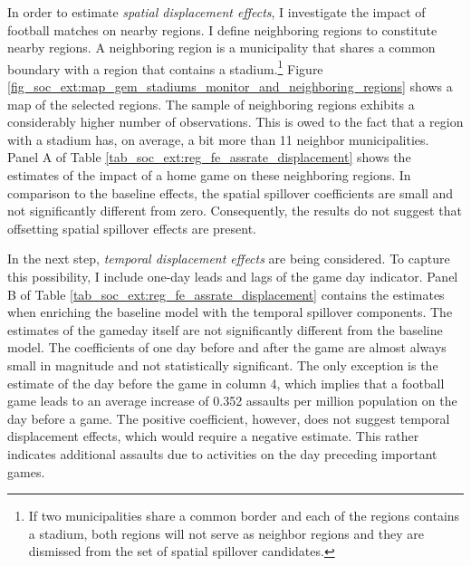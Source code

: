 In order to estimate \textit{spatial displacement effects}, I investigate the impact of football matches on nearby regions. I define neighboring regions to constitute nearby regions. A neighboring region is a municipality that shares a common boundary with a region that contains a stadium.\footnote{If two municipalities share a common border and each of the regions contains a stadium, both regions will not serve as neighbor regions and they are dismissed from the set of spatial spillover candidates.} Figure \ref{fig_soc_ext:map_gem_stadiums_monitor_and_neighboring_regions} shows a map of the selected regions. The sample of neighboring regions exhibits a considerably higher number of observations. This is owed to the fact that a region with a stadium has, on average, a bit more than 11 neighbor municipalities. Panel A of Table \ref{tab_soc_ext:reg_fe_assrate_displacement} shows the estimates of the impact of a home game on these neighboring regions. In comparison to the baseline effects, the spatial spillover coefficients are small and not significantly different from zero. Consequently, the results do not suggest that offsetting spatial spillover effects are present.

In the next step, \textit{temporal displacement effects} are being considered. To capture this possibility, I include one-day leads and lags of the game day indicator. Panel B of Table \ref{tab_soc_ext:reg_fe_assrate_displacement} contains the estimates when enriching the baseline model with the temporal spillover components. The estimates of the gameday itself are not significantly different from the baseline model. The coefficients of one day before and after the game are almost always small in magnitude and not statistically significant. The only exception is the estimate of the day before the game in column 4, which implies that a football game leads to an average increase of 0.352 assaults per million population on the day before a game. The positive coefficient, however, does not suggest temporal displacement effects, which would require a negative estimate. This rather indicates additional assaults due to activities on the day preceding important games. 



